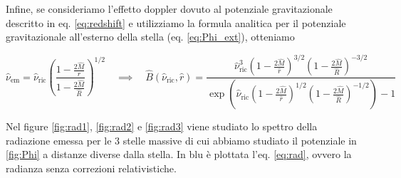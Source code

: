 \documentclass[a4paper, titlepage]{article}
\begin{document}
Infine, se consideriamo l'effetto doppler dovuto al potenziale gravitazionale
descritto in eq. \ref{eq:redshift} e utilizziamo la formula analitica per il
potenziale gravitazionale all'esterno della stella (eq. \ref{eq:Phi_ext}),
otteniamo

\begin{equation}
    \hat \nu_\text{em} = \hat \nu_\text{ric}
    \left ( \frac{1 - \frac{2 \hat M}{r}}{1 - \frac{2 \hat M}{\hat R}}\right )^{1/2}
    \quad
    \implies
    \quad
    \hat B(\hat \nu_\text{ric}, \hat r) =
    \frac{\hat \nu_\text{ric}^3 \left(1 - \frac{2 \hat M}{\hat r}\right)^{3/2}
    \left(1 - \frac{2 \hat M}{\hat R}\right)^{-3/2} }
    {\exp( \hat \nu_\text{ric} \left(1 - \frac{2 \hat M}{\hat r} \right)^{1/2}
    \left(1 - \frac{2 \hat M}{\hat R}\right)^{-1/2} ) - 1}
    \label{eq:B_corr}
\end{equation}

Nel figure \ref{fig:rad1}, \ref{fig:rad2} e \ref{fig:rad3} viene studiato lo
spettro della radiazione emessa per le 3 stelle massive di cui abbiamo studiato
il potenziale in \ref{fig:Phi} a distanze diverse dalla stella.
In blu è plottata l'eq. \ref{eq:rad}, ovvero la radianza senza correzioni
relativistiche.
\end{document}
